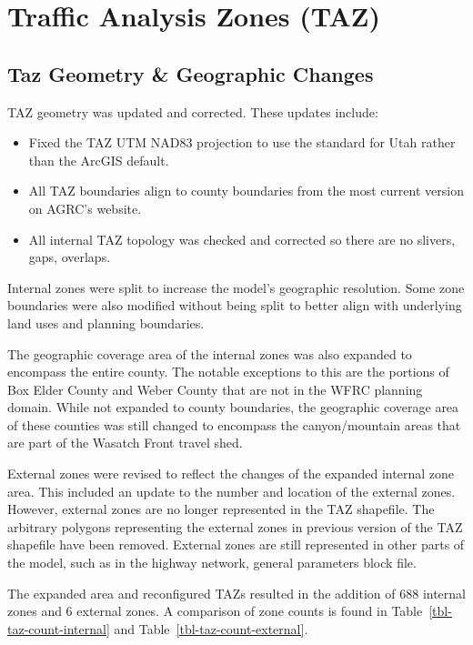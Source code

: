 \documentclass[
  letterpaper,
  DIV=11,
  numbers=noendperiod]{scrreprt}
\providecommand{\tightlist}{%
  \setlength{\itemsep}{0pt}\setlength{\parskip}{0pt}}\usepackage{longtable,booktabs,array}
\begin{document}
\hypertarget{traffic-analysis-zones-taz}{%
\section{Traffic Analysis Zones
(TAZ)}\label{traffic-analysis-zones-taz}}

\hypertarget{taz-geometry-geographic-changes}{%
\subsection{Taz Geometry \& Geographic
Changes}\label{taz-geometry-geographic-changes}}

TAZ geometry was updated and corrected. These updates include:

\begin{itemize}
\tightlist
\item
  Fixed the TAZ UTM NAD83 projection to use the standard for Utah rather
  than the ArcGIS default.
\item
  All TAZ boundaries align to county boundaries from the most current
  version on AGRC's website.
\item
  All internal TAZ topology was checked and corrected so there are no
  slivers, gaps, overlaps.
\end{itemize}

Internal zones were split to increase the model's geographic resolution.
Some zone boundaries were also modified without being split to better
align with underlying land uses and planning boundaries.

The geographic coverage area of the internal zones was also expanded to
encompass the entire county. The notable exceptions to this are the
portions of Box Elder County and Weber County that are not in the WFRC
planning domain. While not expanded to county boundaries, the geographic
coverage area of these counties was still changed to encompass the
canyon/mountain areas that are part of the Wasatch Front travel shed.

External zones were revised to reflect the changes of the expanded
internal zone area. This included an update to the number and location
of the external zones. However, external zones are no longer represented
in the TAZ shapefile. The arbitrary polygons representing the external
zones in previous version of the TAZ shapefile have been removed.
External zones are still represented in other parts of the model, such
as in the highway network, general parameters block file.

The expanded area and reconfigured TAZs resulted in the addition of 688
internal zones and 6 external zones. A comparison of zone counts is
found in Table~\ref{tbl-taz-count-internal} and
Table~\ref{tbl-taz-count-external}.
\end{document}
